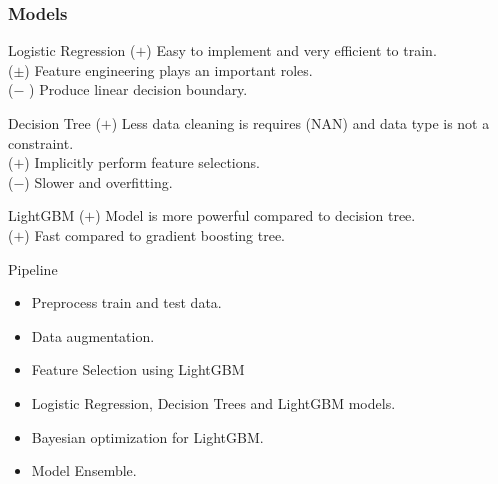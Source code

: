 \documentclass{beamer}
\begin{document}
\begin{frame}
\frametitle{Models}
\begin{block}{Logistic Regression}
($+$) Easy to implement and very efficient to train.\\
($\pm$) Feature engineering plays an important roles. \\
($-$ ) Produce linear decision boundary. \\
\end{block}

\begin{block}{Decision Tree}
($+$) Less data cleaning is requires (NAN) and data type is not a constraint. \\
($+$) Implicitly perform feature selections.\\
($-$) Slower and overfitting. 
\end{block}

\begin{block}{LightGBM}
($+$) Model is more powerful compared to decision tree.\\
($+$) Fast compared to gradient boosting tree.\\
\end{block}
\end{frame}


\begin{frame}{Pipeline}
\begin{itemize}
\item Preprocess train and test data. 
\item Data augmentation. 
\item Feature Selection using LightGBM
\item Logistic Regression, Decision Trees and LightGBM models. 
\item Bayesian optimization for LightGBM. 
\item Model Ensemble. 
\end{itemize}
\end{frame}

\end{document}

